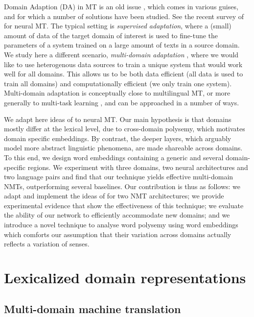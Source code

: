 \documentclass[a4paper]{article}
\begin{document}
Domain Adaption (DA) in MT is an old issue \cite{Foster07mixture,Axelrod11domain}, which comes in various guises, and for which a number of solutions have been studied. 
See the recent survey of \cite{Chu18asurvey} for neural MT. 
The typical setting is \emph{supervised adaptation}, where a (small) amount of data of the target domain of interest is used to fine-tune the parameters of a system trained on a large amount of texts in a source domain. 
We study here a different scenario, \emph{multi-domain adaptation} \cite{Sennrich13multidomain,Farajian17multidomain}, where we would like to use heterogenous data sources to train a unique system that would work well for all domains. 
This allows us to be both data efficient (all data is used to train all domains) and computationally efficient (we only train one system).
Multi-domain adaptation is conceptually close to multilingual MT, or more generally to multi-task learning \cite{Caruana97multitask}, and can be approached in a number of ways. 

We adapt here ideas of \cite{Daume07frustratingly} to neural MT.
Our main hypothesis is that domains mostly differ at the lexical level, due to cross-domain polysemy, which motivates domain specific embeddings. 
By contrast, the deeper layers, which arguably model more abstract linguistic phenomena, are made shareable across domains. 
To this end, we design word embeddings containing a generic and several domain-specific regions. 
We experiment with three domains, two neural architectures and two language pairs and find that our technique yields effective multi-domain NMTs, outperforming several baselines. 
Our contribution is thus as follows:
we adapt and implement the ideas of \cite{Daume07frustratingly} for two NMT architectures;
we provide experimental evidence that show the effectiveness of this technique;
we evaluate the ability of our network to efficiently accommodate new domains;
and we introduce a novel technique to analyse word polysemy using word embeddings which comforts our assumption that their variation across domains actually reflects a variation of senses.

\section{Lexicalized domain representations\label{sec:lexicalized_embeddings}}

\subsection{Multi-domain machine translation \label{ssec:statement}}
\end{document}

